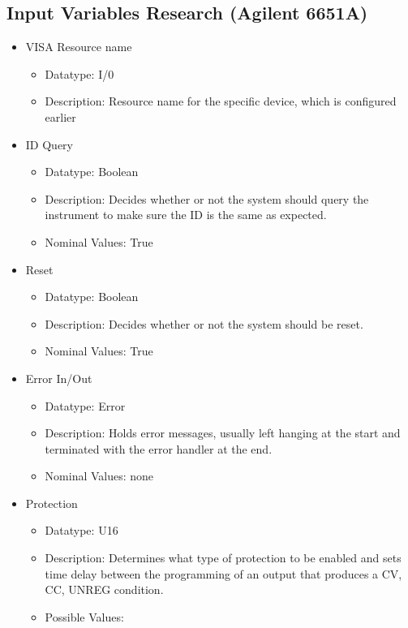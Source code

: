 \documentclass{article}
\begin{document}
\subsection*{Input Variables Research (Agilent 6651A)}
\begin{itemize}
    \item VISA Resource name
    \begin{itemize}
        \item Datatype: I/0
        \item Description: Resource name for the specific device, which is configured earlier
    \end{itemize}
    \item ID Query
    \begin{itemize}
        \item Datatype: Boolean
        \item Description: Decides whether or not the system should query the instrument to make sure the ID is the same as expected.
        \item Nominal Values: True
    \end{itemize}
    \item Reset
    \begin{itemize}
        \item Datatype: Boolean
        \item Description: Decides whether or not the system should be reset.
        \item Nominal Values: True
    \end{itemize}
    \item Error In/Out
    \begin{itemize}
        \item Datatype: Error
        \item Description: Holds error messages, usually left hanging at the start and terminated with the error handler at the end.
        \item Nominal Values: none
    \end{itemize}
    \item Protection
    \begin{itemize}
        \item Datatype: U16
        \item Description: Determines what type of protection to be enabled and sets time delay between the programming of an output that produces a CV, CC, UNREG condition.
        \item Possible Values:
        \begin{itemize}

\end{itemize}
\end{itemize}
\end{itemize}
\end{document}
